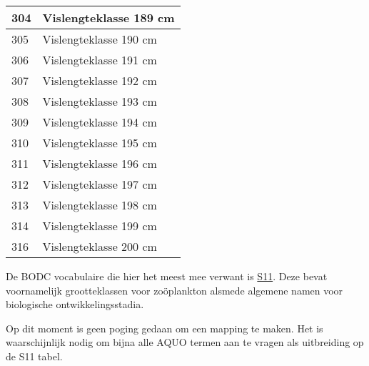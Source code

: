 \documentclass[
]{book}
\begin{document}
\begin{table}
\begin{tabular}[t]{l|l}
\hline
304 & Vislengteklasse 189 cm\\
\hline
305 & Vislengteklasse 190 cm\\
\hline
306 & Vislengteklasse 191 cm\\
\hline
307 & Vislengteklasse 192 cm\\
\hline
308 & Vislengteklasse 193 cm\\
\hline
309 & Vislengteklasse 194 cm\\
\hline
310 & Vislengteklasse 195 cm\\
\hline
311 & Vislengteklasse 196 cm\\
\hline
312 & Vislengteklasse 197 cm\\
\hline
313 & Vislengteklasse 198 cm\\
\hline
314 & Vislengteklasse 199 cm\\
\hline
316 & Vislengteklasse 200 cm\\
\hline
\end{tabular}
\end{table}

De BODC vocabulaire die hier het meest mee verwant is \href{https://vocab.seadatanet.org/v_bodc_vocab_v2/search.asp?lib=S11}{S11}. Deze bevat voornamelijk grootteklassen voor zoöplankton alsmede algemene namen voor biologische ontwikkelingsstadia.

Op dit moment is geen poging gedaan om een mapping te maken. Het is waarschijnlijk nodig om bijna alle AQUO termen aan te vragen als uitbreiding op de S11 tabel.

  
\end{document}

